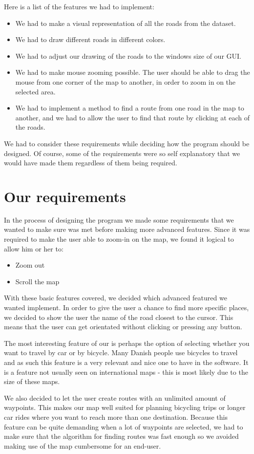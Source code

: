 Here is a list of the features we had to implement: 
\begin{itemize}
  \item We had to make a visual representation of all the roads from the
  dataset.
  \item We had to draw different roads in different colors.
  \item We had to adjust our drawing of the roads to the windows size of our
  GUI.
  \item We had to make mouse zooming possible.  The user should be able to drag
  the mouse from one corner of the map to another, in order to zoom in on the
  selected area.
  \item We had to implement a method to find a route from one road in the map to
  another, and we had to allow the user to find that route by clicking at each
  of the roads.
\end{itemize}
We had to consider these requirements while
deciding how the program should be designed. Of course, some of the
requirements were so self explanatory that we would have made them regardless
of them being required.
\section{Our requirements}
In the process of designing the program we made some requirements that we
wanted to make sure was met before making more advanced features. Since it was
required to make the user able to zoom-in on the map, we found it logical to
allow him or her to:
\begin{itemize}
  \item Zoom out
  \item Scroll the map
\end{itemize}
With these basic features covered, we decided which advanced featured we wanted
implement. In order to give the user a chance to find more specific places, we
decided to show the user the name of the road closest to the cursor. This means
that the user can get orientated without clicking or pressing any button. 

The most interesting feature of our  is perhaps the
option of selecting whether you want to travel by car or by bicycle. Many Danish
people use bicycles to travel and as such this feature is a very relevant and
nice one to have in the software. It is a feature not usually seen on
international maps - this is most likely due to the size of these maps.

We also decided to let the user create routes with an unlimited amount of
waypoints. This makes our map well suited for planning bicycling trips or longer
car rides where you want to reach more than one destination. Because this
feature can be quite demanding when a lot of waypoints are selected, we had to
make sure that the algorithm for finding routes was fast enough so we avoided
making use of the map cumbersome for an end-user.

